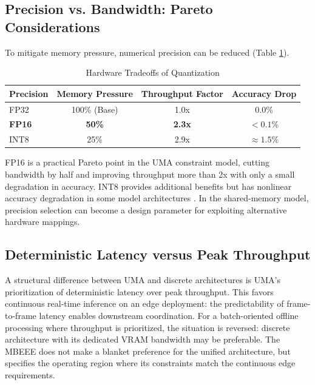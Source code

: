 \documentclass[conference]{IEEEtran}
\begin{document}
\subsection{Precision vs. Bandwidth: Pareto Considerations}
To mitigate memory pressure, numerical precision can be reduced (Table \ref{tab:quantization}).

\begin{table}[htbp]
\caption{Hardware Tradeoffs of Quantization}
\begin{center}
\begin{tabular}{lccc}
\toprule
\textbf{Precision} & \textbf{Memory Pressure} & \textbf{Throughput Factor} & \textbf{Accuracy Drop} \\
\midrule
FP32 & 100\% (Base) & 1.0x & 0.0\% \\
\textbf{FP16} & \textbf{50\%} & \textbf{2.3x} & \textbf{$<0.1\%$} \\
INT8 & 25\% & 2.9x & $\approx 1.5\%$ \\
\bottomrule
\end{tabular}
\end{center}
\label{tab:quantization}
\end{table}

FP16 is a practical Pareto point in the UMA constraint model, cutting bandwidth by half and improving throughput more than 2x with only a small degradation in accuracy. INT8 provides additional benefits but has nonlinear accuracy degradation in some model architectures \cite{b37, b38}. In the shared-memory model, precision selection can become a design parameter for exploiting alternative hardware mappings.

\subsection{Deterministic Latency versus Peak Throughput}
A structural difference between UMA and discrete architectures is UMA's prioritization of deterministic latency over peak throughput. This favors continuous real-time inference on an edge deployment: the predictability of frame-to-frame latency enables downstream coordination. For a batch-oriented offline processing where throughput is prioritized, the situation is reversed: discrete architecture with its dedicated VRAM bandwidth may be preferable. The MBEEE does not make a blanket preference for the unified architecture, but specifies the operating region where its constraints match the continuous edge requirements.
\end{document}
